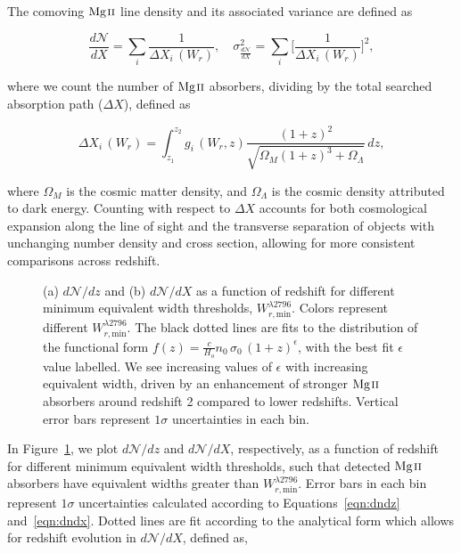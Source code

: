 The comoving ${\hbox{{\rm Mg}\kern 0.1em{\sc ii}}}$ line density and its associated variance are defined as

\begin{equation}
\frac{d \mathcal{N}}{d X} = \sum_{i}\frac{1}{\Delta X_i\,(W_r)},\quad \sigma^2_{\frac{d \mathcal{N}}{d X}} = \sum_{i} \Big[\frac{1}{\Delta X_i\,(W_r)}\Big]^2,
\label{eqn:dndx}
\end{equation}

\noindent
where we count the number of ${\hbox{{\rm Mg}\kern 0.1em{\sc ii}}}$ absorbers, dividing by the total searched absorption path ($\Delta X$), defined as

\begin{equation}
\Delta X_i\,(W_r) = \int_{z_1}^{z_2} g_i\,(W_r, z) \frac{(1 + z)^2}{\sqrt{\Omega_M (1 + z)^3 + \Omega_{\Lambda}}}\,dz,
\label{eqn:deltax}
\end{equation}

\noindent
where $\Omega_M$ is the cosmic matter density, and $\Omega_{\Lambda}$ is the cosmic density attributed to dark energy. Counting with respect to $\Delta X$ accounts for both cosmological expansion along the line of sight and the transverse separation of objects with unchanging number density and cross section, allowing for more consistent comparisons across redshift.

\begin{figure*}[bth]
\caption{(a) $d\mathcal{N}\!/dz$ and (b) $d\mathcal{N}\!/dX$ as a function of redshift for different minimum equivalent width thresholds, $W_{r,\mathrm{min}}^{\lambda2796}$. Colors represent different $W_{r,\mathrm{min}}^{\lambda2796}$. The black dotted lines are fits to the distribution of the functional form $f(z) = \frac{c}{H_o} n_0\,\sigma_0\,(1 + z)^{\epsilon}$, with the best fit $\epsilon$ value labelled. We see increasing values of $\epsilon$ with increasing equivalent width, driven by an enhancement of stronger ${\hbox{{\rm Mg}\kern 0.1em{\sc ii}}}$ absorbers around redshift 2 compared to lower redshifts. Vertical error bars represent $1\sigma$ uncertainties in each bin.}
\label{fig:dndz_dndx}
\end{figure*}

In Figure~\ref{fig:dndz_dndx}, we plot $d\mathcal{N}\!/dz$ and $d\mathcal{N}\!/dX$, respectively, as a function of redshift for different minimum equivalent width thresholds, such that detected ${\hbox{{\rm Mg}\kern 0.1em{\sc ii}}}$ absorbers have equivalent widths greater than $W_{r,\mathrm{min}}^{\lambda2796}$. Error bars in each bin represent $1\sigma$ uncertainties calculated according to Equations~\ref{eqn:dndz} and~\ref{eqn:dndx}. Dotted lines are fit according to the analytical form which allows for redshift evolution in $d\mathcal{N}\!/dX$, defined as,

